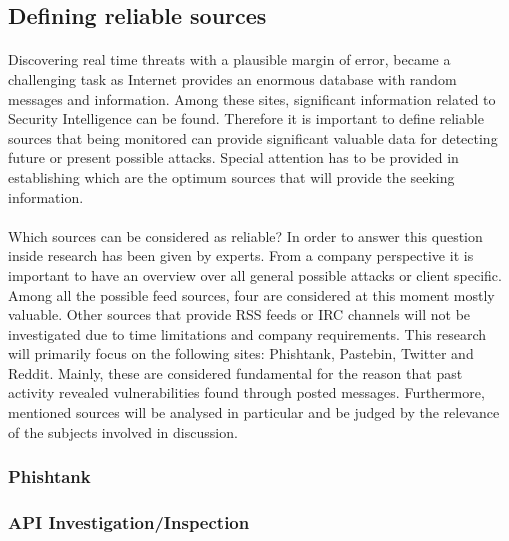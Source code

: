 \documentclass[12pt]{article}
\begin{document}
\subsection{Defining reliable sources}
\parbox{\linewidth}{
\paragraph{}
Discovering real time threats with a plausible margin of error, became a challenging task as Internet provides an enormous database with random messages and information. Among these sites, significant information related to Security Intelligence can be found. Therefore it is important to define reliable sources that being monitored can provide significant valuable data for detecting future or present possible attacks. Special attention has to be provided in establishing which are the optimum sources that will provide the seeking information. 
\paragraph{}
Which sources can be considered as reliable? In order to answer this question inside research has been given by experts. From a company perspective it is important to have an overview over all general possible attacks or client specific. Among all the possible feed sources, four are considered at this moment mostly valuable. Other sources that provide RSS feeds or IRC channels will not be investigated due to time limitations and company requirements. This research will primarily focus on the following sites: Phishtank, Pastebin, Twitter and Reddit. Mainly, these are considered fundamental for the reason that past activity revealed vulnerabilities found through posted messages.  Furthermore, mentioned sources will be analysed in particular and be judged by the relevance of the subjects involved in discussion. 
}
   

\subsubsection*{Phishtank}
\subsubsection{API Investigation/Inspection}
\end{document}
